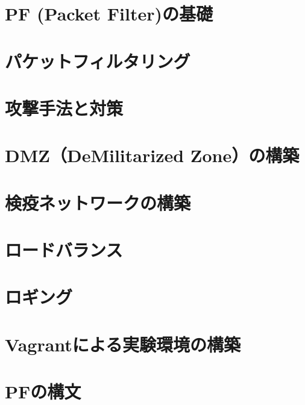 \documentclass[fleqn]{jsarticle}
\begin{document}
\section{PF (Packet Filter)の基礎}

\section{パケットフィルタリング}

\section{攻撃手法と対策}

\section{DMZ（DeMilitarized Zone）の構築}

\section{検疫ネットワークの構築}

\section{ロードバランス}

\section{ロギング}

\appendix

\section{Vagrantによる実験環境の構築}

\section{PFの構文}


\end{document}
